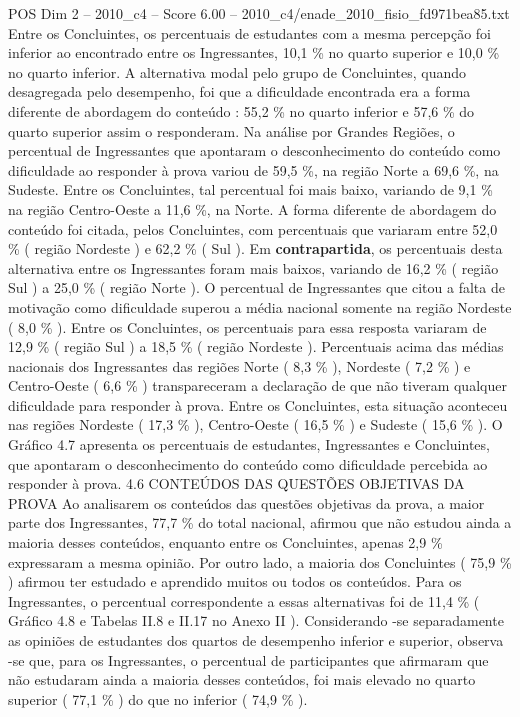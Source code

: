 \begin{textsample}{POS Dim 2 – 2010\_c4 – Score 6.00 – 2010\_c4/enade\_2010\_fisio\_fd971bea85.txt}
Entre os Concluintes, os percentuais de estudantes com a mesma percepção foi inferior ao encontrado entre os Ingressantes, 10,1 \% no quarto superior e 10,0 \% no quarto inferior.
A alternativa modal pelo grupo de Concluintes, quando desagregada pelo desempenho, foi que a dificuldade encontrada era a forma diferente de abordagem do conteúdo : 55,2 \% no quarto inferior e 57,6 \% do quarto superior assim o responderam.
Na análise por Grandes Regiões, o percentual de Ingressantes que apontaram o desconhecimento do conteúdo como dificuldade ao responder à prova variou de 59,5 \%, na região Norte a 69,6 \%, na Sudeste.
Entre os Concluintes, tal percentual foi mais baixo, variando de 9,1 \% na região Centro-Oeste a 11,6 \%, na Norte.
A forma diferente de abordagem do conteúdo foi citada, pelos Concluintes, com percentuais que variaram entre 52,0 \% ( região Nordeste ) e 62,2 \% ( Sul ).
Em \textbf{contrapartida}, os percentuais desta alternativa entre os Ingressantes foram mais baixos, variando de 16,2 \% ( região Sul ) a 25,0 \% ( região Norte ).
O percentual de Ingressantes que citou a falta de motivação como dificuldade superou a média nacional somente na região Nordeste ( 8,0 \% ).
Entre os Concluintes, os percentuais para essa resposta variaram de 12,9 \% ( região Sul ) a 18,5 \% ( região Nordeste ).
Percentuais acima das médias nacionais dos Ingressantes das regiões Norte ( 8,3 \% ), Nordeste ( 7,2 \% ) e Centro-Oeste ( 6,6 \% ) transpareceram a declaração de que não tiveram qualquer dificuldade para responder à prova.
Entre os Concluintes, esta situação aconteceu nas regiões Nordeste ( 17,3 \% ), Centro-Oeste ( 16,5 \% ) e Sudeste ( 15,6 \% ).
O Gráfico 4.7 apresenta os percentuais de estudantes, Ingressantes e Concluintes, que apontaram o desconhecimento do conteúdo como dificuldade percebida ao responder à prova. 4.6 CONTEÚDOS DAS QUESTÕES OBJETIVAS DA PROVA Ao analisarem os conteúdos das questões objetivas da prova, a maior parte dos Ingressantes, 77,7 \% do total nacional, afirmou que não estudou ainda a maioria desses conteúdos, enquanto entre os Concluintes, apenas 2,9 \% expressaram a mesma opinião.
Por outro lado, a maioria dos Concluintes ( 75,9 \% ) afirmou ter estudado e aprendido muitos ou todos os conteúdos.
Para os Ingressantes, o percentual correspondente a essas alternativas foi de 11,4 \% ( Gráfico 4.8 e Tabelas II.8 e II.17 no Anexo II ).
Considerando -se separadamente as opiniões de estudantes dos quartos de desempenho inferior e superior, observa -se que, para os Ingressantes, o percentual de participantes que afirmaram que não estudaram ainda a maioria desses conteúdos, foi mais elevado no quarto superior ( 77,1 \% ) do que no inferior ( 74,9 \% ).

\end{textsample}
